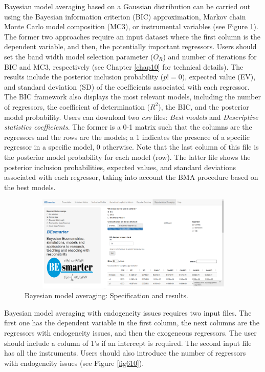 Bayesian model averaging based on a Gaussian distribution can be carried out using the Bayesian information criterion (BIC) approximation, Markov chain Monte Carlo model composition (MC3), or instrumental variables (see Figure \ref{fig69}). The former two approaches require an input dataset where the first column is the dependent variable, and then, the potentially important regressors.
Users should set the band width model selection parameter ($O_R$) and number of iterations for BIC and MC3, respectively (see Chapter \ref{chap10} for technical details). The results include the posterior inclusion probability ($p!=0$), expected value (EV), and standard deviation (SD) of the coefficients associated with each regressor. The BIC framework also displays the most relevant models, including the number of regressors, the coefficient of determination ($R^2$), the BIC, and the posterior model probability. Users can download two \textit{csv} files: \textit{Best models} and \textit{Descriptive statistics coefficients}. The former is a 0-1 matrix such that the columns are the regressors and the rows are the models; a 1 indicates the presence of a specific regressor in a specific model, 0 otherwise. Note that the last column of this file is the posterior model probability for each model (row). The latter file shows the posterior inclusion probabilities, expected values, and standard deviations associated with each regressor, taking into account the BMA procedure based on the best models.

\begin{figure}
	\includegraphics[width=340pt, height=130pt]{Chapters/chapterGUI/figures/Figure9.png}
	\caption[List of figure caption goes here]{Bayesian model averaging: Specification and results.}\label{fig69}
\end{figure} 

Bayesian model averaging with endogeneity issues requires two input files. The first one has the dependent variable in the first column, the next columns are the regressors with endogeneity issues, and then the exogeneous regressors. The user should include a column of 1's if an intercept is required. The second input file has all the instruments. Users should also introduce the number of regressors with endogeneity issues (see Figure \ref{fig610}).

